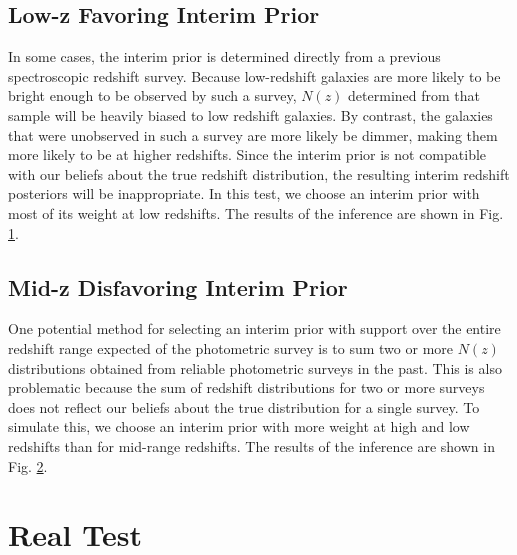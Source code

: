 \documentclass[preprint]{aastex}
\begin{document}
\clearpage
\subsection{Low-z Favoring Interim Prior}
\label{sec:lowz}

In some cases, the interim prior is determined directly from a previous 
spectroscopic redshift survey.  Because low-redshift galaxies are more likely 
to be bright enough to be observed by such a survey, $N(z)$ determined from 
that sample will be heavily biased to low redshift galaxies.  By contrast, the 
galaxies that were unobserved in such a survey are more likely be dimmer, 
making them more likely to be at higher redshifts.  Since the interim prior is 
not compatible with our beliefs about the true redshift distribution, the 
resulting interim redshift posteriors will be inappropriate.  In this test, we 
choose an interim prior with most of its weight at low redshifts.  The results 
of the inference are shown in Fig. \ref{fig:uparam}.

\begin{figure}
\caption{}
\label{fig:uparam}
\end{figure}

\clearpage
\subsection{Mid-z Disfavoring Interim Prior}
\label{sec:midz}

One potential method for selecting an interim prior with support over the 
entire redshift range expected of the photometric survey is to sum two or more 
$N(z)$ distributions obtained from reliable photometric surveys in the past.  
This is also problematic because the sum of redshift distributions for two or 
more surveys does not reflect our beliefs about the true distribution for a 
single survey.  To simulate this, we choose an interim prior with more weight 
at high and low redshifts than for mid-range redshifts.  The results of the 
inference are shown in Fig. \ref{fig:bparam}.

\begin{figure}
\caption{}
\label{fig:bparam}
\end{figure}

\clearpage
\section{Real Test}
\label{sec:boss}
\end{document}
